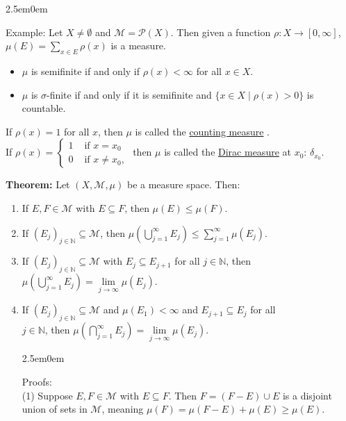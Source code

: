 \documentclass{book}
\newcommand{\hTwo}{%
\color{MidnightBlue}%
   \fontsize{13}{15}\selectfont%
}
\newcommand{\hThree}{%
   \color{PineGreen!85!Orange}
   \fontsize{12}{14}\selectfont%
}
\newcommand{\exOne}{%
   \color{Purple}%
   \fontsize{13}{15}\selectfont%
}
\newenvironment{myIndent}{%
   \begin{adjustwidth}{2.5em}{0em}%
}{%
   \end{adjustwidth}%
}
\newcommand{\udefine}[1]{{%
   \setulcolor{Red}%
   \setul{0.14em}{0.07em}%
   \ul{#1}%
}}
\newcommand{\blab}[1]{\textbf{#1}}
\newcommand{\retTwo}{\hfill\bigbreak}
\begin{document}
\begin{myIndent}\exOne
   Example: Let $X \neq \emptyset$ and $\mathcal{M} = \mathcal{P}(X)$. Then given a function $\rho: X \longrightarrow [0, \infty]$,\\ $\mu(E) = \sum\limits_{x \in E}\rho(x)$ is a measure.
   
   \begin{itemize}
      \item $\mu$ is semifinite if and only if $\rho(x) < \infty$ for all $x \in X$.
      \item $\mu$ is $\sigma$-finite if and only if it is semifinite and $\{x \in X \mid \rho(x) > 0\}$ is countable.
   \end{itemize}

   If $\rho(x) = 1$ for all $x$, then $\mu$ is called the \udefine{counting measure}.\\
   If $\rho(x) = \left\{
   \begin{matrix}
      1 & \text{ if } x = x_0 \\
      0 & \text{ if } x \neq x_0,
   \end{matrix}\right.$ then $\mu$ is called the \udefine{Dirac measure} at $x_0$: $\delta_{x_0}$.\retTwo

   \hTwo 
   \blab{Theorem:} Let $(X, \mathcal{M}, \mu)$ be a measure space. Then:
   \begin{enumerate}
      \item If $E, F \in \mathcal{M}$ with $E \subseteq F$, then $\mu(E) \leq \mu(F)$.
      \item If $(E_j)_{j\in\mathbb{N}} \subseteq \mathcal{M}$, then $\mu(\bigcup\limits_{j=1}^\infty E_j) \leq \sum\limits_{j = 1}^\infty \mu(E_j)$.\\ [-10pt]
      \item If $(E_j)_{j \in \mathbb{N}} \subseteq \mathcal{M}$ with $E_j \subseteq E_{j+1}$ for all $j \in \mathbb{N}$, then $\mu(\bigcup\limits_{j=1}^\infty E_j) = \lim\limits_{j \rightarrow \infty}\mu(E_j)$.
      \item If $(E_j)_{j \in \mathbb{N}} \subseteq \mathcal{M}$ and $\mu(E_1) < \infty$ and $E_{j+1} \subseteq E_j$ for all\\ [-6pt] \phantom{aaaaaaaaaaaaaaaaaaaaaaaaaaaaaaaaaa} $j \in \mathbb{N}$, then $\mu(\bigcap\limits_{j=1}^\infty E_j) = \lim\limits_{j\rightarrow \infty}\mu(E_j)$.
      
      \begin{myIndent}\hThree
         Proofs:\\
         (1) Suppose $E, F \in \mathcal{M}$ with $E \subseteq F$. Then $F = (F - E) \cup E$ is a disjoint union of sets in $\mathcal{M}$, meaning $\mu(F) = \mu(F - E) + \mu(E) \geq \mu(E)$.\newpage


\end{myIndent}
\end{enumerate}
\end{myIndent}
\end{document}
